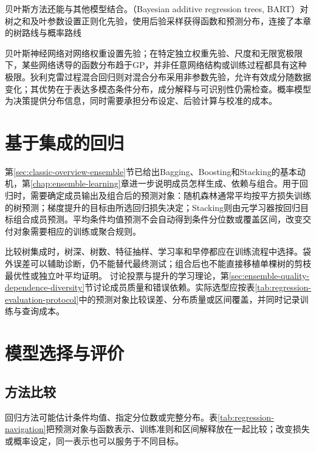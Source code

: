 贝叶斯方法还能与其他模型结合。（Bayesian additive regression trees, BART）对树之和及叶参数设置正则化先验，使用后验采样获得函数和预测分布，连接了本章的树路线与概率路线

贝叶斯神经网络对网络权重设置先验；在特定独立权重先验、尺度和无限宽极限下，某些网络诱导的函数分布趋于GP，并非任意网络结构或训练过程都具有这种极限。狄利克雷过程混合回归则对混合分布采用非参数先验，允许有效成分随数据变化；其优势在于表达多模态条件分布，成分解释与可识别性仍需检查。概率模型为决策提供分布信息，同时需要承担分布设定、后验计算与校准的成本。

\section{基于集成的回归}
\label{sec:regression-ensemble}

第\ref{sec:classic-overview-ensemble}节已给出Bagging、Boosting和Stacking的基本动机，第\ref{chap:ensemble-learning}章进一步说明成员怎样生成、依赖与组合。用于回归时，需要确定成员输出及组合后的预测对象：随机森林通常平均按平方损失训练的树预测；梯度提升的目标由所选回归损失决定；Stacking则由元学习器按回归目标组合成员预测。平均条件均值预测不会自动得到条件分位数或覆盖区间，改变交付对象需要相应的训练或聚合规则。

比较树集成时，树深、树数、特征抽样、学习率和早停都应在训练流程中选择。袋外误差可以辅助诊断，仍不能替代最终测试；组合后也不能直接移植单棵树的剪枝最优性或独立叶平均证明。
讨论投票与提升的学习理论，第\ref{sec:ensemble-quality-dependence-diversity}节讨论成员质量和错误依赖。实际选型应按表\ref{tab:regression-evaluation-protocol}中的预测对象比较误差、分布质量或区间覆盖，并同时记录训练与查询成本。

\section{模型选择与评价}
\label{sec:regression-evaluation}

\subsection{方法比较}

回归方法可能估计条件均值、指定分位数或完整分布。表\ref{tab:regression-navigation}把预测对象与函数表示、训练准则和区间解释放在一起比较；改变损失或概率设定，同一表示也可以服务于不同目标。

